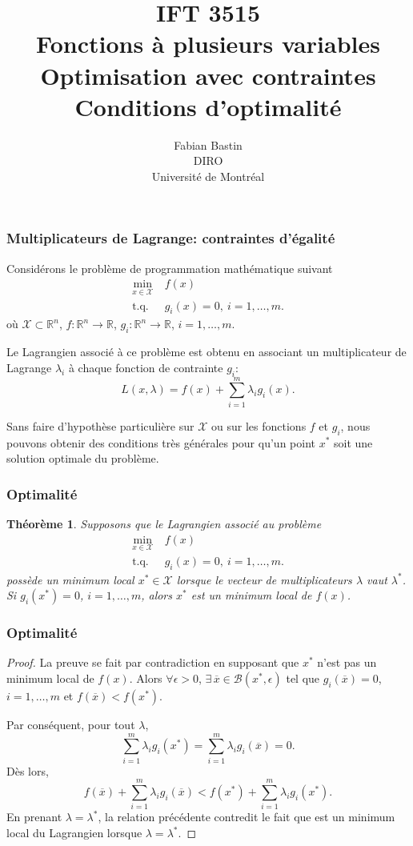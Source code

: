\documentclass[usepdftitle=false]{beamer}
\title[IFT3515]{IFT 3515\\Fonctions à plusieurs variables\\Optimisation avec contraintes\\Conditions d'optimalité}
\author[Fabian Bastin]{Fabian Bastin\\DIRO\\Université de Montréal}
\date{}
\newtheorem{thm}{Théorème}
\def\red{\color{red}}
\def\cB{\mathcal{B}}
\def\cX{\mathcal{X}}
\def\RR{\mathbb{R}}
\begin{document}
\frame{\titlepage}


\begin{frame}
\frametitle{Multiplicateurs de Lagrange: contraintes d'égalité}

Considérons le problème de programmation mathématique suivant
\begin{align*}
\min_{x \in \cX} \ & f(x) \\
\mbox{t.q. } & g_i(x) = 0,\ i = 1,\ldots,m.
\end{align*}
où $\cX \subset \RR^n$, $f: \RR^n \rightarrow \RR$, $g_i: \RR^n \rightarrow \RR$, $i = 1,\ldots,m$.

\mbox{}

Le {\red Lagrangien} associé à ce problème est obtenu en associant un multiplicateur de Lagrange $\lambda_i$ à chaque fonction de contrainte $g_i$:
$$
L(x, \lambda) = f(x) + \sum_{i = 1}^{m} \lambda_i g_i(x).
$$

Sans faire d'hypothèse particulière sur $\cX$ ou sur les fonctions $f$ et $g_i$, nous pouvons obtenir des conditions très générales pour qu'un point $x^*$ soit une solution optimale du problème.

\end{frame}

\begin{frame}
\frametitle{Optimalité}

\begin{thm}
Supposons que le Lagrangien associé au problème
\begin{align*}
\min_{x \in \cX} \ & f(x) \\
\mbox{t.q. } & g_i(x) = 0,\ i = 1,\ldots,m.
\end{align*}
possède un minimum local $x^* \in \cX$ lorsque le vecteur de multiplicateurs $\lambda$ vaut $\lambda^*$.
Si $g_i(x^*) = 0$, $i = 1,\ldots,m$, alors $x^*$ est un minimum local de $f(x)$.
\end{thm}

\end{frame}

\begin{frame}
\frametitle{Optimalité}

\begin{proof}
	La preuve se fait par contradiction en supposant que $x^*$ n'est pas un minimum local de $f(x)$.
	Alors $\forall \epsilon > 0$, $\exists\, \overline{x} \in \cB(x^*, \epsilon)$ tel que $g_i(\overline{x}) = 0$, $i = 1,\ldots,m$ et $f(\overline{x}) < f(x^*)$.
	
Par conséquent, pour tout $\lambda$,
	$$
	\sum_{i = 1}^{m} \lambda_i g_i(x^*) = \sum_{i = 1}^{m} \lambda_i g_i(\overline{x}) = 0.
	$$
	Dès lors,
$$
f(\overline{x}) + \sum_{i = 1}^{m} \lambda_i g_i(\overline{x}) < f(x^*) + \sum_{i = 1}^{m} \lambda_i g_i(x^*).
$$
En prenant $\lambda = \lambda^*$, la relation précédente contredit le fait que est un
minimum local du Lagrangien lorsque $\lambda = \lambda^*$.
\end{proof}

\end{frame}
\end{document}
